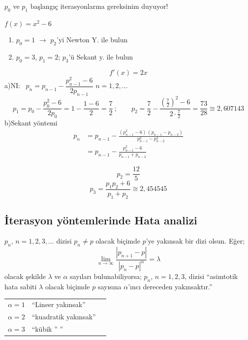 \documentclass[11pt,a4paper]{article}
\begin{document}
\begin{ornek}[2]
$p_0$ ve $p_1$ başlangıç iterasyonlarına gereksinim duyuyor!

$f(x)=x^2-6$
\begin{enumerate}[label=\alph*)]
  \item $p_0=1$ $\rightarrow$ $p_2$'yi Newton Y. ile bulun
  \item $p_0=3$, $p_1=2$; $p_3$'ü Sekant y. ile bulun
\end{enumerate}
\end{ornek}
\[ f'(x)=2x \]
a)\quad NI: \ $p_n=p_{n-1}-\dfrac{p_{n-1}^2-6}{2p_{n-1}}$ \qquad $n=1,2,\dots$
\[
  p_1=p_0-\frac{p_0^2-6}{2p_0}=1-\frac{1-6}{2}=\frac72\ ;\qquad
  p_2=\frac72-\frac{\left(\frac72\right)^2-6}{2\cdot\frac72}=\frac{73}{28}\cong2{,}607143
\]
b)\quad Sekant yöntemi
\begin{align*}
  p_n&=p_{n-1}-\frac{(p_{n-1}^2-6)\,(p_{n-1}-p_{n-2})}{p_{n-1}^2-p_{n-2}^2}\\
     &=p_{n-1}-\frac{p_{n-1}^2-6}{p_{n-1}+p_{n-2}}
\end{align*}

\[ p_2=\frac{12}{5} \]
\[ p_3=\frac{p_1p_2+6}{p_1+p_2}\cong2{,}454545 \]

\subsection{İterasyon yöntemlerinde Hata analizi}
\begin{tanim}
$p_n$, $n=1,2,3,\dots$ dizisi $p_n\neq p$ olacak biçimde $p$'ye yakınsak bir dizi olsun. Eğer;
\[ \lim_{n\to\infty}\frac{|p_{n+1}-p|}{|p_n-p|^{\alpha}}=\lambda \]
olacak şekilde $\lambda$ ve $\alpha$ sayıları bulunabiliyorsa; $p_n$, $n=1,2,3$, dizisi
``asimtotik hata sabiti $\lambda$ olacak biçimde $p$ sayısına $\alpha$'ıncı dereceden yakınsaktır.''
\end{tanim}

\noindent\begin{minipage}[c]{0.3\linewidth}
\end{minipage}

\begin{tabular}{@{}lll}
  $\alpha=1$ & ``Lineer yakınsak'' & \\
  $\alpha=2$ & ``kuadratik yakınsak'' & \\
  $\alpha=3$ & ``kübik \quad '' \quad ''
\end{tabular}
\end{document}
